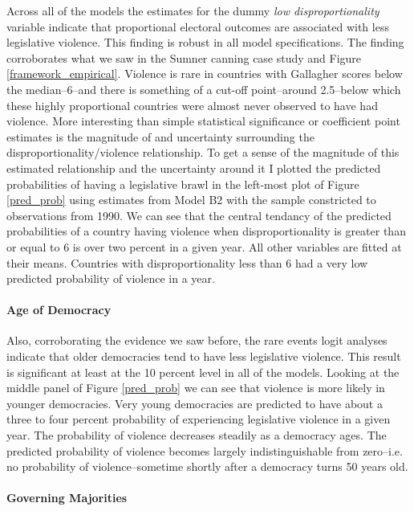 \documentclass[a4paper]{article}\usepackage[]{graphicx}\usepackage[]{color}
\begin{document}
Across all of the models the estimates for the dummy {\emph{low disproportionality}} variable indicate that proportional electoral outcomes are associated with less legislative violence. This finding is robust in all model specifications. The finding corroborates what we saw in the Sumner canning case study and Figure \ref{framework_empirical}. Violence is rare in countries with Gallagher scores below the median--6--and there is something of a cut-off point--around 2.5--below which these highly proportional countries were almost never observed to have had violence. More interesting than simple statistical significance or coefficient point estimates is the magnitude of and uncertainty surrounding the disproportionality/violence relationship. To get a sense of the magnitude of this estimated relationship and the uncertainty around it \citep{King2000} I plotted the predicted probabilities of having a legislative brawl in the left-most plot of Figure \ref{pred_prob} using estimates from Model B2 with the sample constricted to observations from 1990. We can see that the central tendancy of the predicted probabilities of a country having violence when disproportionality is greater than or equal to 6 is over two percent in a given year. All other variables are fitted at their means. Countries with disproportionality less than 6 had a very low predicted probability of violence in a year.

\paragraph{Age of Democracy}

Also, corroborating the evidence we saw before, the rare events logit analyses indicate that older democracies tend to have less legislative violence. This result is significant at least at the 10 percent level in all of the models. Looking at the middle panel of Figure \ref{pred_prob} we can see that violence is more likely in younger democracies. Very young democracies are predicted to have about a three to four percent probability of experiencing legislative violence in a given year. The probability of violence decreases steadily as a democracy ages. The predicted probability of violence becomes largely indistinguishable from zero--i.e. no probability of violence--sometime shortly after a democracy turns 50 years old.

\paragraph{Governing Majorities}
\end{document}
